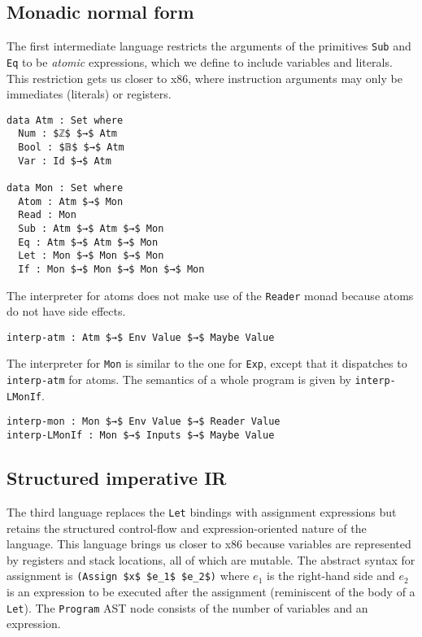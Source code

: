 \documentclass[sigplan,review,dvipsnames,screen,10pt]{acmart}
\begin{document}
\subsection{Monadic normal form}

The first intermediate language restricts the arguments of the
primitives \lstinline{Sub} and \lstinline{Eq} to be \emph{atomic}
expressions, which we define to include variables and literals. This
restriction gets us closer to x86, where instruction arguments may
only be immediates (literals) or registers.


\begin{lstlisting}
data Atm : Set where
  Num : $ℤ$ $→$ Atm 
  Bool : $𝔹$ $→$ Atm 
  Var : Id $→$ Atm

data Mon : Set where
  Atom : Atm $→$ Mon
  Read : Mon
  Sub : Atm $→$ Atm $→$ Mon
  Eq : Atm $→$ Atm $→$ Mon
  Let : Mon $→$ Mon $→$ Mon
  If : Mon $→$ Mon $→$ Mon $→$ Mon
\end{lstlisting}

The interpreter for atoms does not make use of the \lstinline{Reader}
monad because atoms do not have side effects.

\begin{lstlisting}
interp-atm : Atm $→$ Env Value $→$ Maybe Value
\end{lstlisting}

The interpreter for \lstinline{Mon} is similar to the
one for \lstinline{Exp}, except that it dispatches
to \lstinline{interp-atm} for atoms. The semantics
of a whole program is given by \lstinline{interp-LMonIf}.

\begin{lstlisting}
interp-mon : Mon $→$ Env Value $→$ Reader Value
interp-LMonIf : Mon $→$ Inputs $→$ Maybe Value
\end{lstlisting}

\subsection{Structured imperative IR}

The third language replaces the \lstinline{Let} bindings with
assignment expressions but retains the structured control-flow and
expression-oriented nature of the language. This language brings us
closer to x86 because variables are represented by registers and stack
locations, all of which are mutable. The abstract syntax for
assignment is \lstinline{(Assign $x$ $e_1$ $e_2$)} where $e_1$ is the
right-hand side and $e_2$ is an expression to be executed after the
assignment (reminiscent of the body of a \lstinline{Let}).  The
\lstinline{Program} AST node consists of the number of variables and
an expression.
\end{document}
